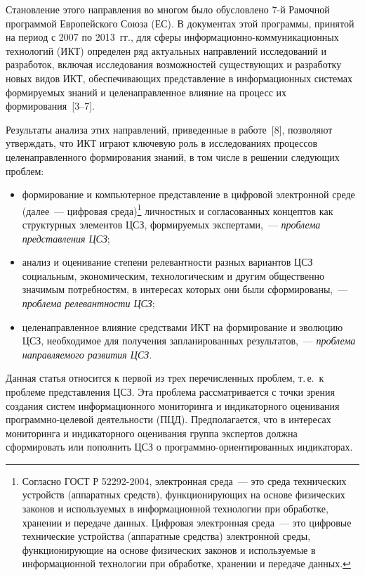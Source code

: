 \begin{multicols}{2}
   Становление этого направления во многом было обусловлено 7-й Рамочной программой 
Европейского Союза (ЕС). В документах этой программы, принятой на период с 2007 по 
2013~гг., для сферы информационно-коммуникационных технологий (ИКТ) определен ряд 
актуальных направлений исследований и разработок, включая исследования возможностей 
существующих и разработку новых видов ИКТ, обеспечивающих представление в 
информационных системах формируемых знаний и целенаправленное влияние на процесс их 
формирования~[3--7].
   
   Результаты анализа этих направлений, приведенные в работе~[8], позволяют утверждать, 
что ИКТ играют ключевую роль в исследованиях процессов целенаправленного 
формирования знаний, в том числе в решении следующих проблем:
   \begin{itemize}
\item формирование и компьютерное представление в циф\-ро\-вой электронной среде 
(далее~--- циф\-ровая среда)\footnote{Согласно ГОСТ Р 52292-2004, электронная среда~--- 
это среда технических устройств (аппаратных средств), функционирующих на основе 
физических законов и используемых в информационной технологии при обработке, 
хранении и передаче данных. Циф\-ро\-вая электронная среда~--- это цифровые технические 
устройства (аппаратные средства) электронной среды, функционирующие на основе физических законов и 
используемые в информационной технологии при обработке, хранении и передаче данных.} личностных 
и согласованных концептов как структурных элементов ЦСЗ, 
формируемых экспертами,~--- \textit{проблема представления ЦСЗ};
\item анализ и оценивание степени релевантности разных вариантов ЦСЗ социальным, 
экономическим, технологическим и другим общественно значимым потребностям, в 
интересах которых они были сформированы,~--- \textit{проблема релевантности ЦСЗ};
\item целенаправленное влияние средствами ИКТ на формирование и эволюцию ЦСЗ, 
необходимое для получения запланированных результатов,~--- \textit{проблема 
направляемого развития ЦСЗ}.
   \end{itemize}
   
   Данная статья относится к первой из трех перечисленных проблем, т.\,е.\ к проблеме 
представления ЦСЗ. Эта проблема рассматривается с точки зрения создания систем 
информационного мониторинга и индикаторного оценивания программно-целевой 
деятельности (ПЦД). Предполагается, что в интересах мониторинга и 
индикаторного оценивания группа экспертов должна сформировать или пополнить ЦСЗ о 
программно-ориентированных индикаторах.
   

\end{multicols}
